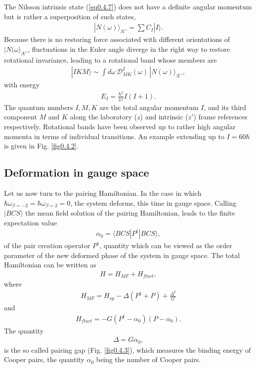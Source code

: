 \documentclass[a4paper,11pt]{book}
\numberwithin{equation}{section}
\numberwithin{figure}{section}
\numberwithin{table}{section}
\newcommand{\braket}[1]{\langle {#1} \rangle }
\newcommand{\ket}[1]{|{#1} \rangle }
\begin{document}
The Nilsson intrinsic state (\ref{eq0.4.7}) does not have a definite angular momentum but is rather a superposition of such states,
\begin{align}\label{eq0.4.11}
\ket{N(\omega)}_{\mathcal K'}=\sum C_I\ket{I}.
\end{align}
Because there is no restoring force associated with different orientations of $\ket{N(\omega}_{\mathcal K'}$, fluctuations in the Euler angle diverge in the right way to restore rotational invariance, leading to a rotational band whose members are 
\begin{align}\label{eq0.1.47}
\ket{IKM}\sim\int d\omega \,\mathcal D^I_{MK}(\omega)\,\ket{N(\omega)}_{\mathcal K'},
\end{align}
with energy
\begin{align}\label{eq0.1.48}
E_I=\frac{\hbar^2}{2\mathcal I}I(I+1).
\end{align}
The quantum numbers $I,M,K$ are the total angular momentum $I$, and its third component $M$ and $K$ along the laboratory ($z$) and intrinsic ($z'$) frame references respectively.
Rotational bands have been observed up to rather high angular momenta in terms of individual transitions. An example extending up to $I=60\hbar$ is given in Fig. \ref{fig0.4.2}. 
\subsection{Deformation in gauge space}
Let us now turn to the pairing Hamiltonian. In the case in which \mbox{$\hbar\omega_{\beta=-2}=\hbar\omega_{\beta=2}=0$}, the system deforms, this time in gauge space. Calling $\ket{BCS}$ the  mean field solution of the pairing Hamiltonian, leads to the finite expectation value
\begin{align}\label{eq0.4.14}
\alpha_0=\braket{BCS|P^\dagger|BCS},
 \end{align}
   of the pair creation operator $P^\dagger$, quantity which can be viewed as the order parameter of the new deformed  phase of the system in gauge space. The total Hamiltonian can be written as
\begin{align}\label{eq0.1.50}
H=H_{MF}+H_{fluct},
\end{align}
where 
\begin{align}\label{eq0.1.51}
H_{MF}=H_{sp}-\Delta(P^\dagger+P)+\frac{\Delta^2}{G}
\end{align}
and
\begin{align}\label{eq0.1.52}
H_{fluct}=-G(P^\dagger-\alpha_0)(P-\alpha_0).
\end{align}
The quantity 
\begin{align}\label{eq0.1.53}
\Delta=G\alpha_0,
\end{align}
is the so called pairing gap (Fig. \ref{fig0.4.3}), which measures the binding energy of Cooper pairs, the quantity $\alpha_0$ being the number of Cooper pairs.
\end{document}
